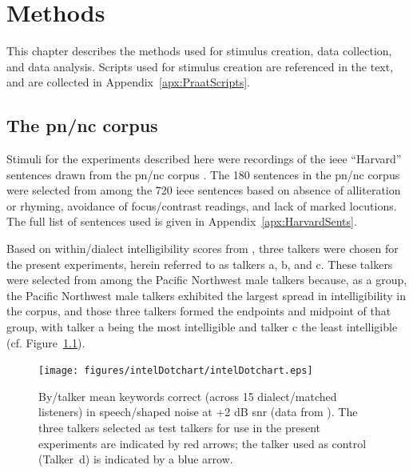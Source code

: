 \chapter{Methods\label{chap:Methods}}

This chapter describes the methods used for stimulus creation, data collection, and data analysis.  Scripts used for stimulus creation are referenced in the text, and are collected in Appendix~\ref{apx:PraatScripts}.%

\section{The \ac{pn/nc} corpus\label{sec:pnnc}}
Stimuli for the experiments described here were recordings of the \ac{ieee} “Harvard” sentences \citep{HarvardSents} drawn from the \ac{pn/nc} corpus \citep{xxx}.  The 180 sentences in the \ac{pn/nc} corpus were selected from among the 720 \ac{ieee} sentences based on absence of alliteration or rhyming, avoidance of focus/contrast readings, and lack of marked locutions.  The full list of sentences used is given in Appendix~\ref{apx:HarvardSents}.  

Based on within\-/dialect intelligibility scores from \citet{McCloyEtAl2013}, three talkers were chosen for the present experiments, herein referred to as talkers \ac{a}, \ac{b}, and \ac{c}.  These talkers were selected from among the Pacific Northwest male talkers because, as a group, the Pacific Northwest male talkers exhibited the largest spread in intelligibility in the corpus, and those three talkers formed the endpoints and midpoint of that group, with talker \ac{a} being the most intelligible and talker \ac{c} the least intelligible (cf. Figure~\ref{fig:dotchart}).

\begin{figure}
	\begin{centering}
	\texttt{[image: figures/intelDotchart/intelDotchart.eps]}
	\caption[Intelligibility of talkers used to make the stimuli]{By\-/talker mean keywords correct (across 15 dialect\-/matched listeners) in speech\-/shaped noise at +2 dB \ac{snr} (data from \citealt{McCloyEtAl2013}).  The three talkers selected as test talkers for use in the present experiments are indicated by red arrows; the talker used as control (Talker~\ac{d}) is indicated by a blue arrow.\label{fig:dotchart}}
	\end{centering}
\end{figure}

